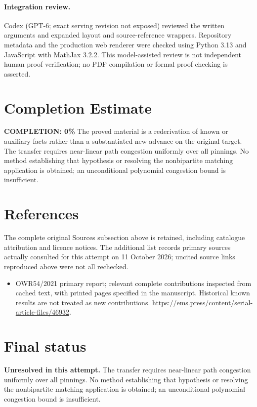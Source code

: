 \documentclass[11pt]{article}
\begin{document}
\paragraph{Integration review.} Codex (GPT-6; exact serving revision not exposed) reviewed the written arguments and expanded layout and source-reference wrappers. Repository metadata and the production web renderer were checked using Python 3.13 and JavaScript with MathJax 3.2.2. This model-assisted review is not independent human proof verification; no PDF compilation or formal proof checking is asserted.

\section{Completion Estimate}
\noindent\textbf{COMPLETION: 0\%}
The proved material is a rederivation of known or auxiliary facts rather than a substantiated new advance on the original target. The transfer requires near-linear path congestion uniformly over all pinnings. No method establishing that hypothesis or resolving the nonbipartite matching application is obtained; an unconditional polynomial congestion bound is insufficient.
\section{References}
The complete original Sources subsection above is retained, including catalogue attribution and licence notices. The additional list records primary sources actually consulted for this attempt on 11 October 2026; uncited source links reproduced above were not all rechecked.
\begin{itemize}
\item OWR54/2021 primary report; relevant complete contributions inspected from cached text, with printed pages specified in the manuscript. Historical known results are not treated as new contributions. \url{https://ems.press/content/serial-article-files/46932}.
\end{itemize}
\section{Final status}
\textbf{Unresolved in this attempt.} The transfer requires near-linear path congestion uniformly over all pinnings. No method establishing that hypothesis or resolving the nonbipartite matching application is obtained; an unconditional polynomial congestion bound is insufficient.
\end{document}
